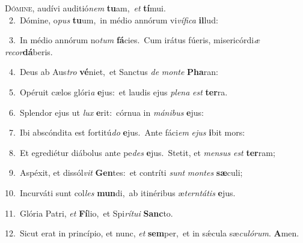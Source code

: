 \lettrine{\initial\textcolor{\initialcolor}{D}}{ómine,} audívi auditió\textit{nem} \textbf{tu}\-am,~\star \textit{et} \textbf{tí}\-mui.\\
{\numbfont\textcolor{\numbcolor}{~2.}}~Dómine, o\textit{pus} \textbf{tu}\-um,~\star in médio annórum vi\-\textit{ví}\-\textit{fi}\textit{ca} \textbf{il}\-lud:\par
{\numbfont\textcolor{\numbcolor}{~3.}}~In médio annórum no\textit{tum} \textbf{fá}\-cies.~\star Cum irátus fúeris, misericórdi\textit{æ} \textit{re}\-\textit{cor}\textbf{dá}beris.\par
{\numbfont\textcolor{\numbcolor}{~4.}}~Deus ab Aus\textit{tro} \textbf{vé}\-niet,~\star et Sanctus \textit{de} \textit{mon}\-\textit{te} \textbf{Pha}\-ran:\par
{\numbfont\textcolor{\numbcolor}{~5.}}~Opéruit cælos glóri\textit{a} \textbf{e}\-jus:~\star et laudis ejus \textit{ple}\-\textit{na} \textit{est} \textbf{ter}\-ra.\par
{\numbfont\textcolor{\numbcolor}{~6.}}~Splendor ejus ut \textit{lux} \textbf{e}\-rit:~\star córnua in \textit{má}\-\textit{ni}\textit{bus} \textbf{e}\-jus:\par
{\numbfont\textcolor{\numbcolor}{~7.}}~Ibi abscóndita est fortitú\textit{do} \textbf{e}\-jus.~\star Ante fáci\textit{em} \textit{e}\-\textit{jus} \textbf{i}\-bit mors:\par
{\numbfont\textcolor{\numbcolor}{~8.}}~Et egrediétur diábolus ante pe\textit{des} \textbf{e}\-jus.~\star Stetit, et \textit{men}\-\textit{sus} \textit{est} \textbf{ter}\-ram;\par
{\numbfont\textcolor{\numbcolor}{~9.}}~Aspéxit, et dissól\textit{vit} \textbf{Gen}\-tes:~\star et contríti \textit{sunt} \textit{mon}\-\textit{tes} \textbf{sæ}\-culi;\par
{\numbfont\textcolor{\numbcolor}{10.}}~Incurváti sunt col\textit{les} \textbf{mun}\-di,~\star ab itinéribus æ\-\textit{tern}\-\textit{tá}\textit{tis} \textbf{e}\-jus.\par
{\numbfont\textcolor{\numbcolor}{11.}}~Glória Patri, \textit{et} \textbf{Fí}\-lio,~\star et Spi\-\textit{rí}\-\textit{tu}\textit{i} \textbf{Sanc}\-to.\par
{\numbfont\textcolor{\numbcolor}{12.}}~Sicut erat in princípio, et nunc, \textit{et} \textbf{sem}\-per,~\star et in sǽcula sæ\-\textit{cu}\-\textit{ló}\textit{rum}. \textbf{A}\-men.\par

